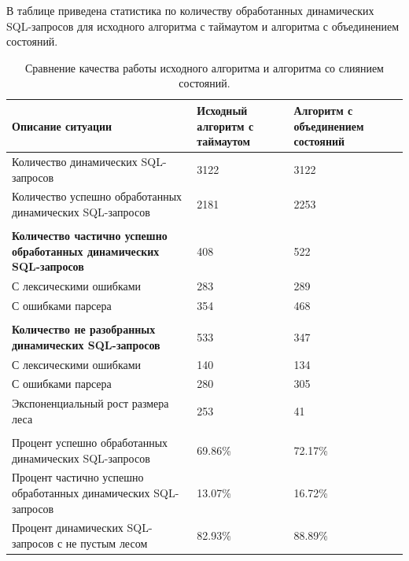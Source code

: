 \documentclass[a5paper]{article}
\begin{document}
В таблице приведена статистика по количеству обработанных динамических SQL-запросов для исходного алгоритма с таймаутом и алгоритма с объединением состояний.
\begin{center}
\begin{table}
\caption{Сравнение качества работы исходного алгоритма и алгоритма со слиянием состояний.}
\begin{tabular}[c c c]{| p{5cm} | p{2.5cm} | p{2.5cm} |}
\hline
Описание ситуации & Исходный алгоритм с таймаутом & Алгоритм с объединением состояний
\\
\hline
Количество динамических SQL-запросов & 3122 & 3122
\\
\hline
Количество успешно обработанных динамических SQL-запросов & 2181 & 2253
\\
\hline
 & &
\\
\hline
\bfseries{Количество частично успешно обработанных динамических SQL-запросов} & 408 & 522
\\
\hline

 С лексическими ошибками & 283 & 289
\\
\hline

 С ошибками парсера & 354 & 468
\\
\hline
 & &
\\
\hline

\bfseries{Количество не разобранных динамических SQL-запросов} & 533 & 347
\\
\hline
  С лексическими ошибками & 140 & 134
\\
\hline

 С ошибками парсера & 280 & 305
\\
\hline

 Экспоненциальный рост размера леса & 253 & 41

\\
\hline
 & &
\\
\hline


Процент успешно обработанных динамических SQL-запросов & 69.86\% & 72.17\%
\\
\hline

Процент частично успешно обработанных динамических SQL-запросов & 13.07\% & 16.72\%
\\
\hline

Процент динамических SQL-запросов с не пустым лесом & 82.93\% & 88.89\%
\\
\hline
 
\end{tabular}
\end{table}
\end{center}
\end{document}
